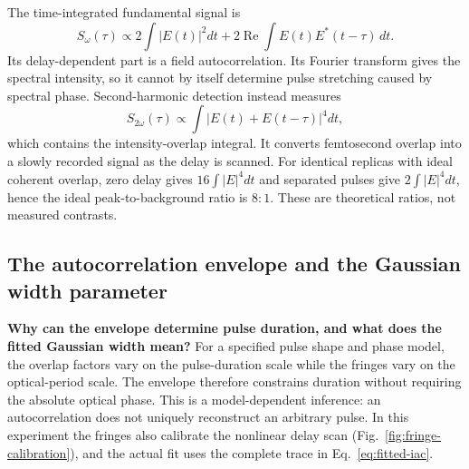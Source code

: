 The time-integrated fundamental signal is
\begin{equation}
S_\omega(\tau)\propto 2\int |E(t)|^2dt+
2\operatorname{Re}\int E(t)E^*(t-\tau)\,dt.
\end{equation}
Its delay-dependent part is a field autocorrelation. Its Fourier transform gives the spectral intensity, so it cannot by itself determine pulse stretching caused by spectral phase. Second-harmonic detection instead measures
\begin{equation}
S_{2\omega}(\tau)\propto\int |E(t)+E(t-\tau)|^4dt,
\end{equation}
which contains the intensity-overlap integral. It converts femtosecond overlap into a slowly recorded signal as the delay is scanned. For identical replicas with ideal coherent overlap, zero delay gives $16\int|E|^4dt$ and separated pulses give $2\int|E|^4dt$, hence the ideal peak-to-background ratio is $8:1$. These are theoretical ratios, not measured contrasts.

\subsection{The autocorrelation envelope and the Gaussian width parameter}
\textbf{Why can the envelope determine pulse duration, and what does the fitted Gaussian width mean?}
For a specified pulse shape and phase model, the overlap factors vary on the pulse-duration scale while the fringes vary on the optical-period scale. The envelope therefore constrains duration without requiring the absolute optical phase. This is a model-dependent inference: an autocorrelation does not uniquely reconstruct an arbitrary pulse. In this experiment the fringes also calibrate the nonlinear delay scan (Fig.~\ref{fig:fringe-calibration}), and the actual fit uses the complete trace in Eq.~\eqref{eq:fitted-iac}.


